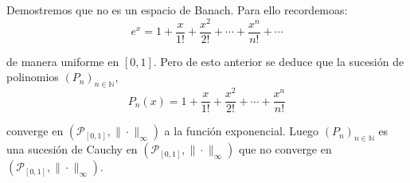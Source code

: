 \documentclass{article}
\begin{document}
\begin{enumerate}
\begin{itemize}
Demostremos que no es un espacio de Banach. Para ello recordemoas:
\begin{equation*}
e^x=1+\frac{x}{1!}+\frac{x^2}{2!}+\cdots+\frac{x^n}{n!}+\cdots
\end{equation*}

de manera uniforme en $[0,1]$. Pero de esto anterior se deduce que la sucesión de polinomios $(P_n)_{n\in\mathbb{N}}$,
\begin{equation*}
P_n(x)=1+\frac{x}{1!}+\frac{x^2}{2!}+\cdots+\frac{x^n}{n!}
\end{equation*}

converge en $(\mathcal{P}_{[0,1]},\|\cdot\|_\infty)$ a la función exponencial. Luego $(P_n)_{n\in\mathbb{N}}$ es una sucesión de Cauchy en $(\mathcal{P}_{[0,1]},\|\cdot\|_\infty)$ que no converge en $(\mathcal{P}_{[0,1]},\|\cdot\|_\infty)$.
\end{itemize}
\end{enumerate}
\end{document}
